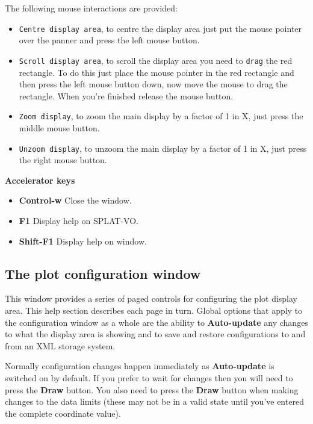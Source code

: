 \documentclass[twoside,11pt]{article}
\renewcommand{\_}{\texttt{\symbol{95}}}
\newcommand{\SPLAT}{\textsf{SPLAT-VO}}
\newcommand{\labelitem}[1]{\textbf{#1}}
\newcommand{\hitext}[1]{\texttt{#1}}
\newcommand{\subheading}[1]{\textbf{\large{#1}}}
\begin{document}
The following mouse interactions are provided:
\begin{itemize}

 \item \hitext{Centre display area}, to centre the display area just
 put the mouse pointer over the panner and press the left mouse
 button.

 \item \hitext{Scroll display area}, to scroll the display area you
 need to \hitext{drag} the red rectangle. To do this just place the
 mouse pointer in the red rectangle and then press the left mouse
 button down, now move the mouse to drag the rectangle. When you're
 finished release the mouse button.

 \item \hitext{Zoom display}, to zoom the main display by a factor of
 1 in X, just press the middle mouse button.

 \item \hitext{Unzoom display}, to unzoom the main display by a factor
 of 1 in X, just press the right mouse button.

\end{itemize}

\subheading{Accelerator keys}

\begin{itemize}
\item \labelitem{Control-w} Close the window.
\item \labelitem{F1} Display help on \SPLAT.     
\item \labelitem{Shift-F1} Display help on window.
\end{itemize}

\newpage
\subsection{The plot configuration window}

This window provides a series of paged controls for configuring the
plot display area. This help section describes each page in
turn. Global options that apply to the configuration window as a whole
are the ability to \labelitem{Auto-update} any changes to what the
display area is showing and to save and restore configurations to and
from an XML storage system.

Normally configuration changes happen immediately as \labelitem{Auto-update}
is switched on by default. If you prefer to wait for changes then you will
need to press the \labelitem{Draw} button. You also need to press the
\labelitem{Draw} button when making changes to the data limits (these may not
be in a valid state until you've entered the complete coordinate value).
\end{document}
